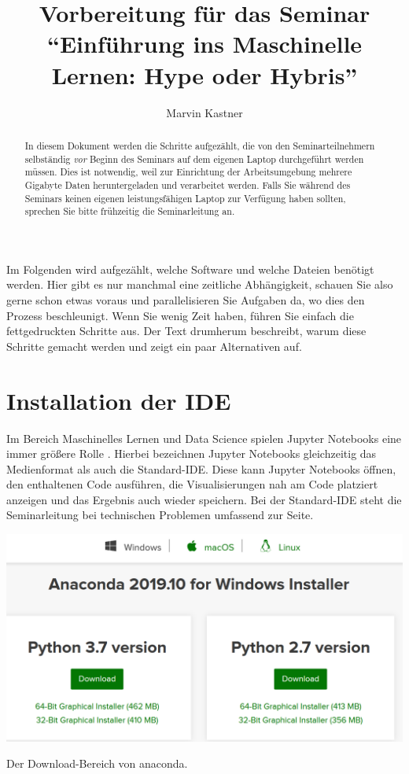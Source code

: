 \documentclass{tufte-handout}
\title{Vorbereitung für das Seminar \enquote{Einführung ins Maschinelle Lernen: Hype oder Hybris}}
\author{Marvin Kastner}
\begin{document}
\maketitle%

\begin{abstract}
\noindent
In diesem Dokument werden die Schritte aufgezählt, die von den Seminarteilnehmern selbständig \emph{vor} Beginn des Seminars auf dem eigenen Laptop durchgeführt werden müssen.
Dies ist notwendig, weil zur Einrichtung der Arbeitsumgebung mehrere Gigabyte Daten heruntergeladen und verarbeitet werden.
Falls Sie während des Seminars keinen eigenen leistungsfähigen Laptop zur Verfügung haben sollten, sprechen Sie bitte frühzeitig die Seminarleitung an.
\end{abstract}

Im Folgenden wird aufgezählt, welche Software und welche Dateien benötigt werden.
Hier gibt es nur manchmal eine zeitliche Abhängigkeit, schauen Sie also gerne schon etwas voraus und parallelisieren Sie Aufgaben da, wo dies den Prozess beschleunigt.
Wenn Sie wenig Zeit haben, führen Sie einfach die fettgedruckten Schritte aus.
Der Text drumherum beschreibt, warum diese Schritte gemacht werden und zeigt ein paar Alternativen auf.

\section{Installation der IDE}

Im Bereich Maschinelles Lernen und Data Science spielen Jupyter Notebooks eine immer größere Rolle%
\cite{perkel_why_2018,hiltch_jupyter_2019}.
Hierbei bezeichnen Jupyter Notebooks gleichzeitig das Medienformat als auch die Standard-IDE.
Diese kann Jupyter Notebooks öffnen, den enthaltenen Code ausführen, die Visualisierungen nah am Code platziert anzeigen und das Ergebnis auch wieder speichern.
Bei der Standard-IDE steht die Seminarleitung bei technischen Problemen umfassend zur Seite.

\begin{marginfigure}
  \includegraphics{anaconda}
  \caption{Der Download-Bereich von anaconda.}%
\label{fig:anaconda}
\end{marginfigure}
\end{document}
